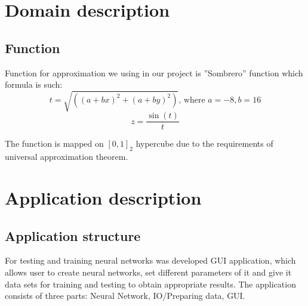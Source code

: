 \documentclass[a4paper,12pt]{article}
\begin{document}
\section{Domain description}

\subsection{Function}
Function for approximation we using in our project is ''Sombrero'' function which formula is such:
\begin{equation}
 t = \sqrt{((a+bx)^2+(a+by)^2)} \text{, where } a = -8, b = 16
 \end{equation}
 \begin{equation}
 z = \frac
 {\sin(t)}
 {t}
\end{equation}

The function is mapped on $[0,1]_2$ hypercube due to the requirements of universal approximation theorem.





\section{Application description}

\subsection{Application structure}

For testing and training neural networks was developed GUI application, which allows user to create neural networks, set different parameters of it and give it data sets for training and  testing to obtain appropriate results. The application consists of three parts: Neural Network, IO/Preparing data, GUI. 
\end{document}
